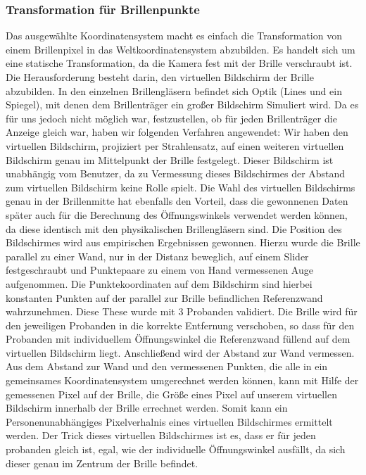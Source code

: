\subsubsection*{Transformation für Brillenpunkte}
Das ausgewählte Koordinatensystem macht es einfach die Transformation von einem Brillenpixel in das Weltkoordinatensystem abzubilden. 
Es handelt sich um eine statische Transformation, da die Kamera fest mit der Brille verschraubt ist. 
Die Herausforderung besteht darin, den virtuellen Bildschirm der Brille abzubilden. In den einzelnen Brillengläsern befindet sich Optik (Lines und ein Spiegel), mit denen dem Brillenträger ein großer Bildschirm Simuliert wird. 
Da es für uns jedoch nicht möglich war, festzustellen, ob für jeden Brillenträger die Anzeige gleich war, haben wir folgenden Verfahren angewendet: 
Wir haben den virtuellen Bildschirm, projiziert per Strahlensatz, auf einen weiteren virtuellen Bildschirm genau im Mittelpunkt der Brille festgelegt. 
Dieser Bildschirm ist unabhängig vom Benutzer, da zu Vermessung dieses Bildschirmes der Abstand zum virtuellen Bildschirm keine Rolle spielt.
Die Wahl des virtuellen Bildschirms genau in der Brillenmitte hat ebenfalls den Vorteil, dass die gewonnenen Daten später auch für die Berechnung des Öffnungswinkels verwendet werden können, da diese identisch mit den physikalischen Brillengläsern sind.
Die Position des Bildschirmes wird aus empirischen Ergebnissen gewonnen. 
Hierzu wurde die Brille parallel zu einer Wand, nur in der Distanz beweglich, auf einem Slider festgeschraubt und Punktepaare zu einem von Hand vermessenen Auge aufgenommen. 
Die Punktekoordinaten auf dem Bildschirm sind hierbei konstanten Punkten auf der parallel zur Brille befindlichen Referenzwand wahrzunehmen.
Diese These wurde mit 3 Probanden validiert. 
Die Brille wird für den jeweiligen Probanden in die korrekte Entfernung verschoben, so dass für den Probanden mit individuellem Öffnungswinkel die Referenzwand füllend auf dem virtuellen Bildschirm liegt.  
Anschließend wird der Abstand zur Wand vermessen. 
Aus dem Abstand zur Wand und den vermessenen Punkten, die alle in ein gemeinsames Koordinatensystem umgerechnet werden können, kann mit Hilfe der gemessenen Pixel auf der Brille, die Größe eines Pixel auf unserem virtuellen Bildschirm innerhalb der Brille errechnet werden. 
Somit kann ein Personenunabhängiges Pixelverhalnis eines virtuellen Bildschirmes ermittelt werden. 
Der Trick dieses virtuellen Bildschirmes ist es, dass er für jeden probanden gleich ist, egal, wie der individuelle Öffnungswinkel ausfällt, da sich dieser genau im Zentrum der Brille befindet. 
